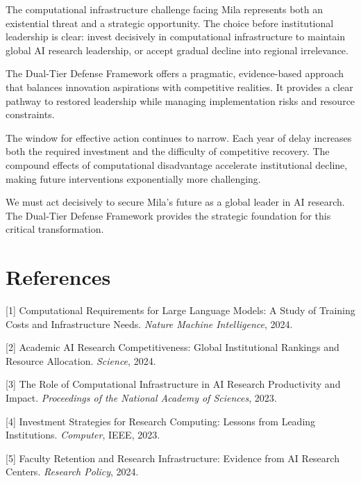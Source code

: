 \documentclass{article}
\begin{document}
The computational infrastructure challenge facing Mila represents both an existential threat and a strategic opportunity. The choice before institutional leadership is clear: invest decisively in computational infrastructure to maintain global AI research leadership, or accept gradual decline into regional irrelevance.

The Dual-Tier Defense Framework offers a pragmatic, evidence-based approach that balances innovation aspirations with competitive realities. It provides a clear pathway to restored leadership while managing implementation risks and resource constraints.

The window for effective action continues to narrow. Each year of delay increases both the required investment and the difficulty of competitive recovery. The compound effects of computational disadvantage accelerate institutional decline, making future interventions exponentially more challenging.

We must act decisively to secure Mila's future as a global leader in AI research. The Dual-Tier Defense Framework provides the strategic foundation for this critical transformation.

\section*{References}

{
\small

[1] Computational Requirements for Large Language Models: A Study of Training Costs and Infrastructure Needs. \textit{Nature Machine Intelligence}, 2024.

[2] Academic AI Research Competitiveness: Global Institutional Rankings and Resource Allocation. \textit{Science}, 2024.

[3] The Role of Computational Infrastructure in AI Research Productivity and Impact. \textit{Proceedings of the National Academy of Sciences}, 2023.

[4] Investment Strategies for Research Computing: Lessons from Leading Institutions. \textit{Computer}, IEEE, 2023.

[5] Faculty Retention and Research Infrastructure: Evidence from AI Research Centers. \textit{Research Policy}, 2024.
}
\end{document}
